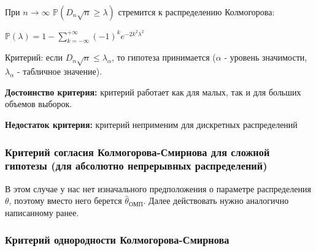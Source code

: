 \documentclass[11pt]{article}
\begin{document}
При \(n\rightarrow\infty\)
\(\mathbb{P}\left(D_n\sqrt{n} \geq \lambda\right)\) стремится к
распределению Колмогорова:

\(\mathbb{P}(\lambda)=1 - \sum\limits_{k=-\infty}^{+\infty}(-1)^ke^{-2k^2\lambda^2}\)

Критерий: если \(D_n\sqrt{n} \leq \lambda_{\alpha}\), то гипотеза
принимается (\(\alpha\) - уровень значимости, \(\lambda_{\alpha}\) -
табличное значение).

\textbf{Достоинство критерия:} критерий работает как для малых, так и
для больших объемов выборок.

\textbf{Недостаток критерия:} критерий неприменим для дискретных
распределений

\hypertarget{ux43aux440ux438ux442ux435ux440ux438ux439-ux441ux43eux433ux43bux430ux441ux438ux44f-ux43aux43eux43bux43cux43eux433ux43eux440ux43eux432ux430-ux441ux43cux438ux440ux43dux43eux432ux430-ux434ux43bux44f-ux441ux43bux43eux436ux43dux43eux439-ux433ux438ux43fux43eux442ux435ux437ux44b-ux434ux43bux44f-ux430ux431ux441ux43eux43bux44eux442ux43dux43e-ux43dux435ux43fux440ux435ux440ux44bux432ux43dux44bux445-ux440ux430ux441ux43fux440ux435ux434ux435ux43bux435ux43dux438ux439}{%
\subsubsection*{Критерий согласия Колмогорова-Смирнова для сложной гипотезы
(для абсолютно непрерывных
распределений)}\label{ux43aux440ux438ux442ux435ux440ux438ux439-ux441ux43eux433ux43bux430ux441ux438ux44f-ux43aux43eux43bux43cux43eux433ux43eux440ux43eux432ux430-ux441ux43cux438ux440ux43dux43eux432ux430-ux434ux43bux44f-ux441ux43bux43eux436ux43dux43eux439-ux433ux438ux43fux43eux442ux435ux437ux44b-ux434ux43bux44f-ux430ux431ux441ux43eux43bux44eux442ux43dux43e-ux43dux435ux43fux440ux435ux440ux44bux432ux43dux44bux445-ux440ux430ux441ux43fux440ux435ux434ux435ux43bux435ux43dux438ux439}}

В этом случае у нас нет изначального предположения о параметре
распределения \(\theta\), поэтому вместо него берется
\(\hat{\theta}_{ОМП}\). Далее действовать нужно аналогично написанному
ранее.

    \hypertarget{ux43aux440ux438ux442ux435ux440ux438ux439-ux43eux434ux43dux43eux440ux43eux434ux43dux43eux441ux442ux438-ux43aux43eux43bux43cux43eux433ux43eux440ux43eux432ux430-ux441ux43cux438ux440ux43dux43eux432ux430}{%
\subsubsection*{Критерий однородности
Колмогорова-Смирнова}\label{ux43aux440ux438ux442ux435ux440ux438ux439-ux43eux434ux43dux43eux440ux43eux434ux43dux43eux441ux442ux438-ux43aux43eux43bux43cux43eux433ux43eux440ux43eux432ux430-ux441ux43cux438ux440ux43dux43eux432ux430}}
\end{document}
